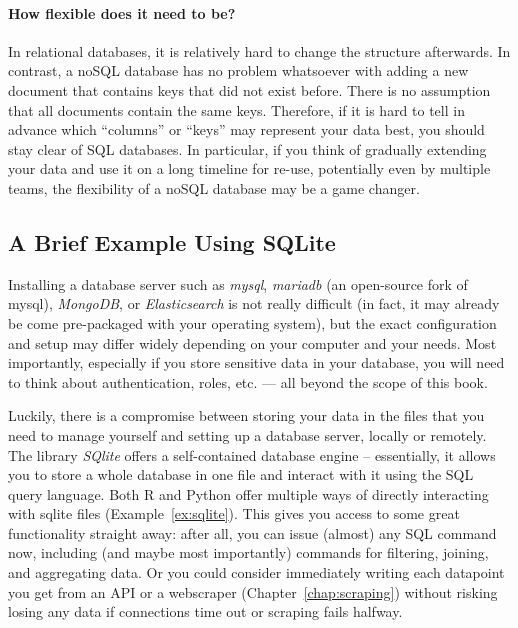 \paragraph[How flexible does it need to be?]{How flexible does it need to be?}
In relational databases, it is relatively hard to change the structure afterwards. In contrast, a noSQL database has no problem whatsoever with adding a new document that contains keys that did not exist before. There is no assumption that all documents contain the same keys. Therefore, if it is hard to tell in advance which ``columns'' or ``keys'' may represent your data best, you should stay clear of SQL databases. In particular, if you think of gradually extending your data and use it on a long timeline for re-use, potentially even by multiple teams, the flexibility of a noSQL database may be a game changer.



\subsection{A Brief Example Using SQLite}

Installing a database server such as \emph{mysql}, \emph{mariadb} (an
open-source fork of mysql), \emph{MongoDB}, or \emph{Elasticsearch} is
not really difficult (in fact, it may already be come pre-packaged
with your operating system), but the exact configuration and setup may
differ widely depending on your computer and your needs. Most
importantly, especially if you store sensitive data in your database,
you will need to think about authentication, roles, etc. --- all
beyond the scope of this book.

Luckily, there is a compromise between storing your data in the files
that you need to manage yourself and setting up a database server,
locally or remotely. The library \emph{SQlite} offers a self-contained
database engine -- essentially, it allows you to store a whole
database in one file and interact with it using the SQL query language.
Both R and Python offer multiple ways of directly interacting with
sqlite files (Example~\ref{ex:sqlite}). This gives you access to some great
functionality straight away: after all, you can issue (almost) any SQL command
now, including (and maybe most importantly) commands for filtering,
joining, and aggregating data. Or you could consider immediately writing
each datapoint you get from an API or a webscraper (Chapter~\ref{chap:scraping})
without risking  losing any data if connections time out or scraping
fails halfway.

